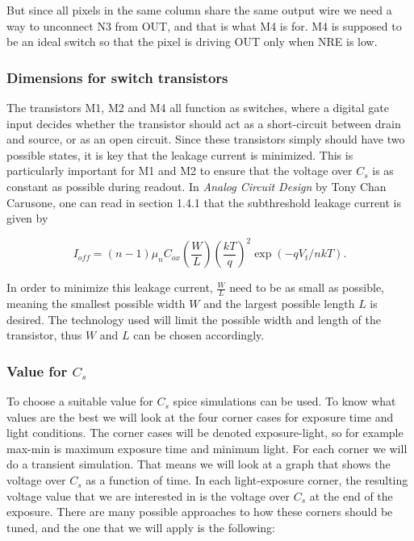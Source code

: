 But since all pixels in the same column share the same output wire we need a way to unconnect N3 from OUT, and that is what M4 is for. M4 is supposed to be an ideal switch so that the pixel is driving OUT only when NRE is low.

\subsubsection{Dimensions for switch transistors}
\label{sec:switch_dimensions}
The transistors M1, M2 and M4 all function as switches, where a digital gate input decides whether the transistor should act as a short-circuit between drain and source, or as an open circuit. Since these transistors simply should have two possible states, it is key that the leakage current is minimized. This is particularly important for M1 and M2 to ensure that the voltage over $C_s$ is as constant as possible during readout. In \emph{Analog Circuit Design} by Tony Chan Carusone, one can read in section 1.4.1 that the subthreshold leakage current is given by

\begin{equation}
    \label{eq:leakage}
    I_{off} = (n-1) \mu_n C_{ox} \left( \frac{W}{L} \right) \left( \frac{kT}{q} \right)^2 \exp{(-qV_t / nkT)}.
\end{equation}

In order to minimize this leakage current, $\frac{W}{L}$ need to be as small as possible, meaning the smallest possible width $W$ and the largest possible length $L$ is desired. The technology used will limit the possible width and length of the transistor, thus $W$ and $L$ can be chosen accordingly.

\subsubsection{Value for $C_s$}

To choose a suitable value for $C_s$ spice simulations can be used. To know what values are the best we will look at the four corner cases for exposure time and light conditions. The corner cases will be denoted exposure-light, so for example max-min is maximum exposure time and minimum light. For each corner we will do a transient simulation. That means we will look at a graph that shows the voltage over $C_s$ as a function of time. In each light-exposure corner, the resulting voltage value that we are interested in is the voltage over $C_s$ at the end of the exposure. There are many possible approaches to how these corners should be tuned, and the one that we will apply is the following:

